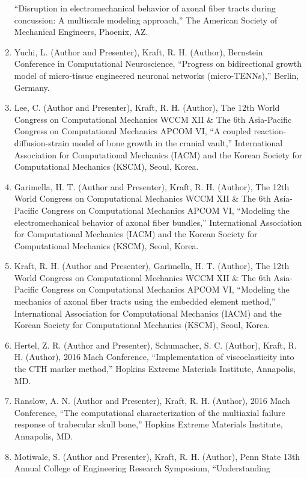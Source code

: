 \documentclass[11pt]{article}
\begin{document}
\begin{enumerate}
  ``Disruption in electromechanical behavior of axonal fiber tracts
  during concussion: A multiscale modeling approach,'' The American
  Society of Mechanical Engineers, Phoenix, AZ.
\item
  Yuchi, L. 
(Author and Presenter), Kraft, R. 
H. 
(Author), Bernstein
  Conference in Computational Neuroscience, ``Progress on bidirectional
  growth model of micro-tissue engineered neuronal networks
  (micro-TENNs),'' Berlin, Germany.
\item
  Lee, C. 
(Author and Presenter), Kraft, R. 
H. 
(Author), The 12th World
  Congress on Computational Mechanics WCCM XII \& The 6th Asia-Pacific
  Congress on Computational Mechanics APCOM VI, ``A coupled
  reaction-diffusion-strain model of bone growth in the cranial vault,''
  International Association for Computational Mechanics (IACM) and the
  Korean Society for Computational Mechanics (KSCM), Seoul, Korea.
\item
  Garimella, H. 
T. 
(Author and Presenter), Kraft, R. 
H. 
(Author), The
  12th World Congress on Computational Mechanics WCCM XII \& The 6th
  Asia-Pacific Congress on Computational Mechanics APCOM VI, ``Modeling
  the electromechanical behavior of axonal fiber bundles,'' International
  Association for Computational Mechanics (IACM) and the Korean Society
  for Computational Mechanics (KSCM), Seoul, Korea.
\item
  Kraft, R. 
H. 
(Author and Presenter), Garimella, H. 
T. 
(Author), The
  12th World Congress on Computational Mechanics WCCM XII \& The 6th
  Asia-Pacific Congress on Computational Mechanics APCOM VI, ``Modeling
  the mechanics of axonal fiber tracts using the embedded element
  method,'' International Association for Computational Mechanics (IACM)
  and the Korean Society for Computational Mechanics (KSCM), Seoul,
  Korea.
\item
  Hertel, Z. 
R. 
(Author and Presenter), Schumacher, S. 
C. 
(Author),
  Kraft, R. 
H. 
(Author), 2016 Mach Conference, ``Implementation of
  viscoelasticity into the CTH marker method,'' Hopkins Extreme Materials
  Institute, Annapolis, MD.
\item
  Ranslow, A. 
N. 
(Author and Presenter), Kraft, R. 
H. 
(Author), 2016
  Mach Conference, ``The computational characterization of the multiaxial
  failure response of trabecular skull bone,'' Hopkins Extreme Materials
  Institute, Annapolis, MD.
\item
  Motiwale, S. 
(Author and Presenter), Kraft, R. 
H. 
(Author), Penn State
  13th Annual College of Engineering Research Symposium, ``Understanding

\end{enumerate}
\end{document}

